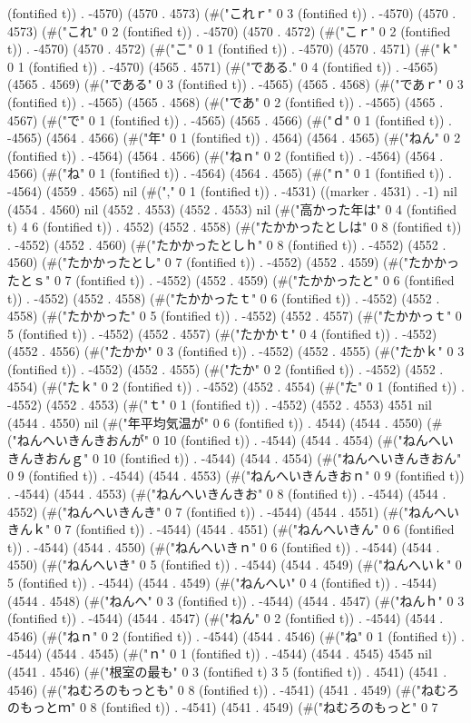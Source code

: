 (fontified t)) . -4570) (4570 . 4573) (#("これｒ" 0 3 (fontified t)) . -4570) (4570 . 4573) (#("これ" 0 2 (fontified t)) . -4570) (4570 . 4572) (#("こｒ" 0 2 (fontified t)) . -4570) (4570 . 4572) (#("こ" 0 1 (fontified t)) . -4570) (4570 . 4571) (#("ｋ" 0 1 (fontified t)) . -4570) (4565 . 4571) (#("である." 0 4 (fontified t)) . -4565) (4565 . 4569) (#("である" 0 3 (fontified t)) . -4565) (4565 . 4568) (#("であｒ" 0 3 (fontified t)) . -4565) (4565 . 4568) (#("であ" 0 2 (fontified t)) . -4565) (4565 . 4567) (#("で" 0 1 (fontified t)) . -4565) (4565 . 4566) (#("ｄ" 0 1 (fontified t)) . -4565) (4564 . 4566) (#("年" 0 1 (fontified t)) . 4564) (4564 . 4565) (#("ねん" 0 2 (fontified t)) . -4564) (4564 . 4566) (#("ねｎ" 0 2 (fontified t)) . -4564) (4564 . 4566) (#("ね" 0 1 (fontified t)) . -4564) (4564 . 4565) (#("ｎ" 0 1 (fontified t)) . -4564) (4559 . 4565) nil (#("," 0 1 (fontified t)) . -4531) ((marker . 4531) . -1) nil (4554 . 4560) nil (4552 . 4553) (4552 . 4553) nil (#("高かった年は" 0 4 (fontified t) 4 6 (fontified t)) . 4552) (4552 . 4558) (#("たかかったとしは" 0 8 (fontified t)) . -4552) (4552 . 4560) (#("たかかったとしｈ" 0 8 (fontified t)) . -4552) (4552 . 4560) (#("たかかったとし" 0 7 (fontified t)) . -4552) (4552 . 4559) (#("たかかったとｓ" 0 7 (fontified t)) . -4552) (4552 . 4559) (#("たかかったと" 0 6 (fontified t)) . -4552) (4552 . 4558) (#("たかかったｔ" 0 6 (fontified t)) . -4552) (4552 . 4558) (#("たかかった" 0 5 (fontified t)) . -4552) (4552 . 4557) (#("たかかっｔ" 0 5 (fontified t)) . -4552) (4552 . 4557) (#("たかかｔ" 0 4 (fontified t)) . -4552) (4552 . 4556) (#("たかか" 0 3 (fontified t)) . -4552) (4552 . 4555) (#("たかｋ" 0 3 (fontified t)) . -4552) (4552 . 4555) (#("たか" 0 2 (fontified t)) . -4552) (4552 . 4554) (#("たｋ" 0 2 (fontified t)) . -4552) (4552 . 4554) (#("た" 0 1 (fontified t)) . -4552) (4552 . 4553) (#("ｔ" 0 1 (fontified t)) . -4552) (4552 . 4553) 4551 nil (4544 . 4550) nil (#("年平均気温が" 0 6 (fontified t)) . 4544) (4544 . 4550) (#("ねんへいきんきおんが" 0 10 (fontified t)) . -4544) (4544 . 4554) (#("ねんへいきんきおんｇ" 0 10 (fontified t)) . -4544) (4544 . 4554) (#("ねんへいきんきおん" 0 9 (fontified t)) . -4544) (4544 . 4553) (#("ねんへいきんきおｎ" 0 9 (fontified t)) . -4544) (4544 . 4553) (#("ねんへいきんきお" 0 8 (fontified t)) . -4544) (4544 . 4552) (#("ねんへいきんき" 0 7 (fontified t)) . -4544) (4544 . 4551) (#("ねんへいきんｋ" 0 7 (fontified t)) . -4544) (4544 . 4551) (#("ねんへいきん" 0 6 (fontified t)) . -4544) (4544 . 4550) (#("ねんへいきｎ" 0 6 (fontified t)) . -4544) (4544 . 4550) (#("ねんへいき" 0 5 (fontified t)) . -4544) (4544 . 4549) (#("ねんへいｋ" 0 5 (fontified t)) . -4544) (4544 . 4549) (#("ねんへい" 0 4 (fontified t)) . -4544) (4544 . 4548) (#("ねんへ" 0 3 (fontified t)) . -4544) (4544 . 4547) (#("ねんｈ" 0 3 (fontified t)) . -4544) (4544 . 4547) (#("ねん" 0 2 (fontified t)) . -4544) (4544 . 4546) (#("ねｎ" 0 2 (fontified t)) . -4544) (4544 . 4546) (#("ね" 0 1 (fontified t)) . -4544) (4544 . 4545) (#("ｎ" 0 1 (fontified t)) . -4544) (4544 . 4545) 4545 nil (4541 . 4546) (#("根室の最も" 0 3 (fontified t) 3 5 (fontified t)) . 4541) (4541 . 4546) (#("ねむろのもっとも" 0 8 (fontified t)) . -4541) (4541 . 4549) (#("ねむろのもっとｍ" 0 8 (fontified t)) . -4541) (4541 . 4549) (#("ねむろのもっと" 0 7 